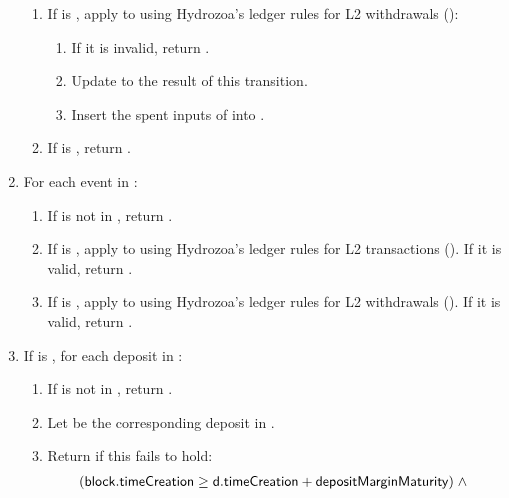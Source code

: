 \documentclass[../hydrozoa.tex]{subfiles}
\begin{document}
\begin{enumerate}
\begin{enumerate}
      \item If  is , apply  to  using Hydrozoa's ledger rules for L2 withdrawals ():
        \begin{enumerate}
          \item If it is invalid, return .
          \item Update  to the result of this transition.
          \item Insert the spent inputs of  into .
        \end{enumerate}
      \item If  is , return .
    \end{enumerate}
  \item For each event  in :
    \begin{enumerate}
      \item If  is not in , return .
      \item If  is , apply  to  using Hydrozoa's ledger rules for L2 transactions (). If it is valid, return .
      \item If  is , apply  to  using Hydrozoa's ledger rules for L2 withdrawals (). If it is valid, return .
    \end{enumerate}
  \item If  is , for each deposit  in :
    \begin{enumerate}
      \item If  is not in , return .
      \item Let  be the corresponding deposit in .
      \item Return  if this fails to hold:
        \begin{equation*}
        \begin{split}
          &(\T{block.timeCreation} \geq \T{d.timeCreation} + \T{depositMarginMaturity}) \;\land\;\\

\end{split}
\end{equation*}
\end{enumerate}
\end{enumerate}
\end{document}
